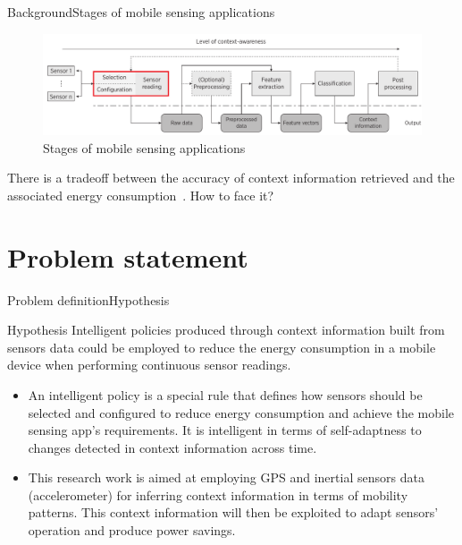 \documentclass[10pt,xcolor={dvipsnames}]{beamer}
\begin{document}
\begin{frame}{Background}{Stages of mobile sensing applications}
\begin{figure}%
  \centering
  \includegraphics[width=\textwidth]{vectors/msa-stages}
  \caption{Stages of mobile sensing applications}
  \label{fig:msa-stages}
\end{figure}
There is a tradeoff between the accuracy of context information retrieved and the associated energy consumption~\cite{Sim2014,Rachuri2012}.
How to face it?
\end{frame}

\section{Problem statement}
\begin{frame}{Problem definition}{Hypothesis}
\begin{exampleblock}{Hypothesis}
Intelligent policies produced through context information built from sensors data could be employed to reduce the energy consumption in a mobile device when performing continuous sensor readings.
\end{exampleblock}
{
\small
\pause
\begin{itemize}
  \item An intelligent policy is a special rule that defines how sensors should be selected and configured to reduce energy consumption and achieve the mobile sensing app's requirements.
  It is intelligent in terms of self-adaptness to changes detected in context information across time.
  \pause
  \item This research work is aimed at employing GPS and inertial sensors data (accelerometer) for inferring context information in terms of mobility patterns.
  This context information will then be exploited to adapt sensors' operation and produce power savings.
\end{itemize}
}
\end{frame}
\end{document}
